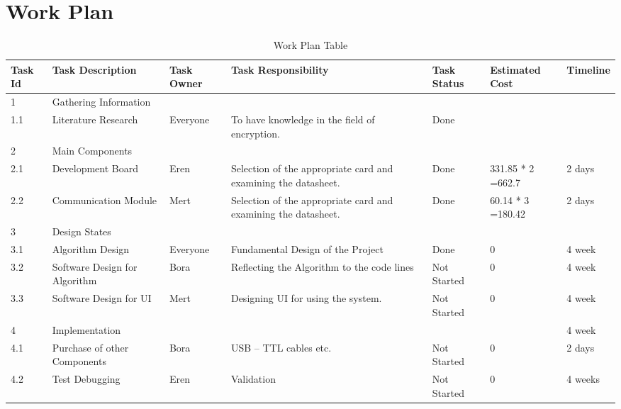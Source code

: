 \documentclass[12pt]{article}
\begin{document}
 	\section{Work Plan}
	\begin{table}[H]

 		\renewcommand{\arraystretch}{0.2}
 	\centering
 	\begin{longtable}{|p{1cm}|p{2.75cm}|p{1.6cm}|p{2.5cm}|p{1.25cm}|p{1.5cm}|p{2cm}|}	\hline
 		Task Id & Task Description & Task Owner & Task Responsibility & Task Status & Estimated Cost & Timeline \\
 		\hline
 		\endfirsthead
		
 		1 & Gathering Information &  &  &  & & \\  \hline
 		1.1 & Literature Research & Everyone & To have knowledge in the field of encryption. & Done &  & \\  \hline
 		2 & Main Components &  &  &  &  & \\  \hline
 		2.1 & Development Board & Eren & Selection of the appropriate card and  examining the datasheet.& Done & 331.85 * 2 =662.7  & 2 days \\  \hline
 		2.2 & Communication Module & Mert & Selection of the appropriate card and  examining the datasheet.  & Done  & 60.14 * 3 =180.42  & 2 days  \\  \hline
 		3 & Design States &  &  &  &  & \\  \hline
 		3.1 & Algorithm Design & Everyone & Fundamental Design of the Project  & Done  & 0  & 4 week  \\  \hline
 		3.2 & Software Design for Algorithm & Bora  & Reflecting the Algorithm to the code lines  & Not Started  & 0 & 4 week\\  \hline
 		3.3& Software Design for UI & Mert  & Designing UI for using the system. & Not Started  & 0  & 4 week \\  \hline
 		4 & Implementation &   &  &   &   & 4 week \\  \hline
 		4.1 & Purchase of other Components & Bora  & USB – TTL cables etc.  & Not Started  & 0 & 2 days  \\  \hline
 		4.2 & Test Debugging& Eren  & Validation  & Not Started  & 0  & 4 weeks  \\
 		\hline
 	
 	\end{longtable}
 		\caption{Work Plan Table}
\end{table}
 

 	\newpage
\end{document}
